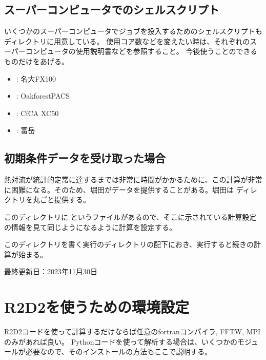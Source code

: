 \documentclass[letterpaper,10pt,dvipdfmx,report]{sphinxmanual}
\begin{document}
\section{スーパーコンピュータでのシェルスクリプト}
\label{\detokenize{start:id5}}
\sphinxAtStartPar
いくつかのスーパーコンピュータでジョブを投入するためのシェルスクリプトも  ディレクトリに用意している。
使用コア数などを変えたい時は、それぞれのスーパーコンピュータの使用説明書などを参照すること。
今後使うことのできるものだけをあげる。
\begin{itemize}
\item {} 
\sphinxAtStartPar
{} : 名大FX100

\item {} 
\sphinxAtStartPar
{} : Oakforest\sphinxhyphen{}PACS

\item {} 
\sphinxAtStartPar
{} : CfCA XC50

\item {} 
\sphinxAtStartPar
{} : 富岳

\end{itemize}


\section{初期条件データを受け取った場合}
\label{\detokenize{start:id6}}
\sphinxAtStartPar
熱対流が統計的定常に達するまでは非常に時間がかかるために、この計算が非常に困難になる。そのため、堀田がデータを提供することがある。堀田は  ディレクトリを丸ごと提供する。

\sphinxAtStartPar
このディレクトリに  というファイルがあるので、そこに示されている計算設定の情報を見て同じようになるように計算を設定する。

\sphinxAtStartPar
このディレクトリを書く実行のディレクトリの配下におき、実行すると続きの計算が始まる。

\sphinxAtStartPar
最終更新日：2023年11月30日

\sphinxstepscope


\chapter{R2D2を使うための環境設定}
\label{\detokenize{environment:r2d2}}\label{\detokenize{environment::doc}}
\sphinxAtStartPar
R2D2コードを使って計算するだけならば任意のfortranコンパイラ, FFTW, MPIのみがあれば良い。
Pythonコードを使って解析する場合は、いくつかのモジュールが必要なので、そのインストールの方法もここで説明する。
\end{document}
